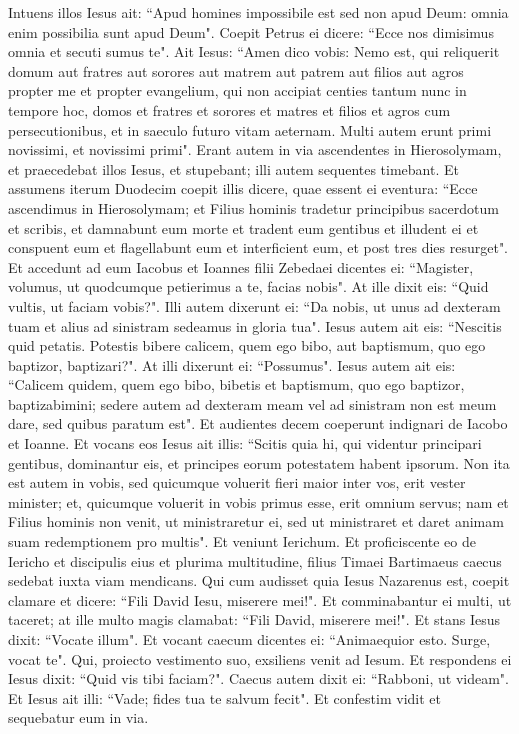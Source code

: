 \begin{biblechapter}
\verse Intuens illos Iesus ait: “Apud homines impossibile est sed non apud Deum: omnia enim possibilia sunt apud Deum". 
\verse Coepit Petrus ei dicere: “Ecce nos dimisimus omnia et secuti sumus te". 
\verse Ait Iesus: “Amen dico vobis: Nemo est, qui reliquerit domum aut fratres aut sorores aut matrem aut patrem aut filios aut agros propter me et propter evangelium, 
\verse qui non accipiat centies tantum nunc in tempore hoc, domos et fratres et sorores et matres et filios et agros cum persecutionibus, et in saeculo futuro vitam aeternam. 
\verse Multi autem erunt primi novissimi, et novissimi primi". 
\verse Erant autem in via ascendentes in Hierosolymam, et praecedebat illos Iesus, et stupebant; illi autem sequentes timebant. Et assumens iterum Duodecim coepit illis dicere, quae essent ei eventura: 
\verse “Ecce ascendimus in Hierosolymam; et Filius hominis tradetur principibus sacerdotum et scribis, et damnabunt eum morte et tradent eum gentibus 
\verse et illudent ei et conspuent eum et flagellabunt eum et interficient eum, et post tres dies resurget". 
\verse Et accedunt ad eum Iacobus et Ioannes filii Zebedaei dicentes ei: “Magister, volumus, ut quodcumque petierimus a te, facias nobis". 
\verse At ille dixit eis: “Quid vultis, ut faciam vobis?". 
\verse Illi autem dixerunt ei: “Da nobis, ut unus ad dexteram tuam et alius ad sinistram sedeamus in gloria tua".  
\verse Iesus autem ait eis: “Nescitis quid petatis. Potestis bibere calicem, quem ego bibo, aut baptismum, quo ego baptizor, baptizari?". 
\verse At illi dixerunt ei: “Possumus". Iesus autem ait eis: “Calicem quidem, quem ego bibo, bibetis et baptismum, quo ego baptizor, baptizabimini; 
\verse sedere autem ad dexteram meam vel ad sinistram non est meum dare, sed quibus paratum est". 
\verse Et audientes decem coeperunt indignari de Iacobo et Ioanne. 
\verse Et vocans eos Iesus ait illis: “Scitis quia hi, qui videntur principari gentibus, dominantur eis, et principes eorum potestatem habent ipsorum. 
\verse Non ita est autem in vobis, sed quicumque voluerit fieri maior inter vos, erit vester minister; 
\verse et, quicumque voluerit in vobis primus esse, erit omnium servus; 
\verse nam et Filius hominis non venit, ut ministraretur ei, sed ut ministraret et daret animam suam redemptionem pro multis". 
\verse Et veniunt Ierichum. Et proficiscente eo de Iericho et discipulis eius et plurima multitudine, filius Timaei Bartimaeus caecus sedebat iuxta viam mendicans. 
\verse Qui cum audisset quia Iesus Nazarenus est, coepit clamare et dicere: “Fili David Iesu, miserere mei!". 
\verse Et comminabantur ei multi, ut taceret; at ille multo magis clamabat: “Fili David, miserere mei!". 
\verse Et stans Iesus dixit: “Vocate illum". Et vocant caecum dicentes ei: “Animaequior esto. Surge, vocat te". 
\verse Qui, proiecto vestimento suo, exsiliens venit ad Iesum. 
\verse Et respondens ei Iesus dixit: “Quid vis tibi faciam?". Caecus autem dixit ei: “Rabboni, ut videam". 
\verse Et Iesus ait illi: “Vade; fides tua te salvum fecit". Et confestim vidit et sequebatur eum in via. 
\end{biblechapter}


